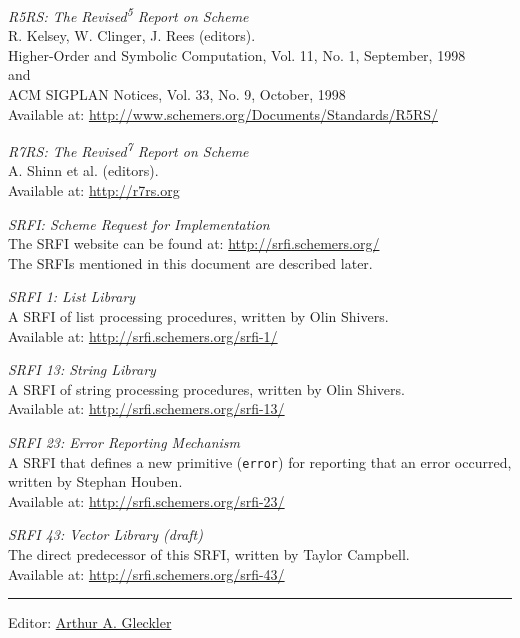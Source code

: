 \begin{description}
\tightlist
\item[\href{}{R5RS}]
\emph{R5RS: The Revised\textsuperscript{5} Report on Scheme}\\
R. Kelsey, W. Clinger, J. Rees (editors).\\
Higher-Order and Symbolic Computation, Vol. 11, No. 1, September, 1998\\
and\\
ACM SIGPLAN Notices, Vol. 33, No. 9, October, 1998\\
Available at:
\url{http://www.schemers.org/Documents/Standards/R5RS/}

\item[\href{}{R7RS-small}]
\emph{R7RS: The Revised\textsuperscript{7} Report on Scheme}\\
A. Shinn et al. (editors).\\
Available at: \url{http://r7rs.org}

\item[\href{}{SRFI}]
\emph{SRFI: Scheme Request for Implementation}\\
The SRFI website can be found at: \url{http://srfi.schemers.org/}\\
The SRFIs mentioned in this document are described
later.

\item[\href{}{SRFI 1}]
\emph{SRFI 1: List Library}\\
A SRFI of list processing procedures, written by Olin Shivers.\\
Available at: \url{http://srfi.schemers.org/srfi-1/}

\item[\href{}{SRFI 13}]
\emph{SRFI 13: String Library}\\
A SRFI of string processing procedures, written by Olin Shivers.\\
Available at: \url{http://srfi.schemers.org/srfi-13/}

\item[\href{}{SRFI 23}]
\emph{SRFI 23: Error Reporting Mechanism}\\
A SRFI that defines a new primitive (\texttt{error}) for reporting that
an error occurred, written by Stephan Houben.\\
Available at: \url{http://srfi.schemers.org/srfi-23/}
 
\item[\href{}{SRFI 43}]
\emph{SRFI 43: Vector Library (draft)}\\
The direct predecessor of this SRFI, written by Taylor Campbell.\\
Available at: \url{http://srfi.schemers.org/srfi-43/}
\end{description}

\begin{center}\rule{0.5\linewidth}{\linethickness}\end{center}

Editor:
\href{mailto:srfi\%20minus\%20editors\%20at\%20srfi\%20dot\%20schemers\%20dot\%20org}{Arthur
A. Gleckler}
